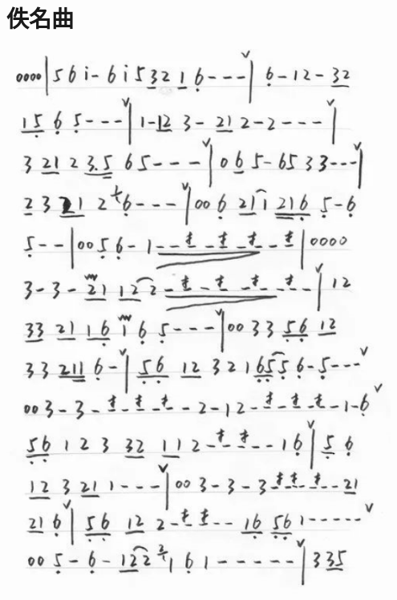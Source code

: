 \documentclass[cn,pad,twocol]{elegantbook}
\begin{document}
\section{佚名曲}\includegraphics[width=0.95\textwidth]{dongxiao/20200819/佚名曲.png}
\end{document}
